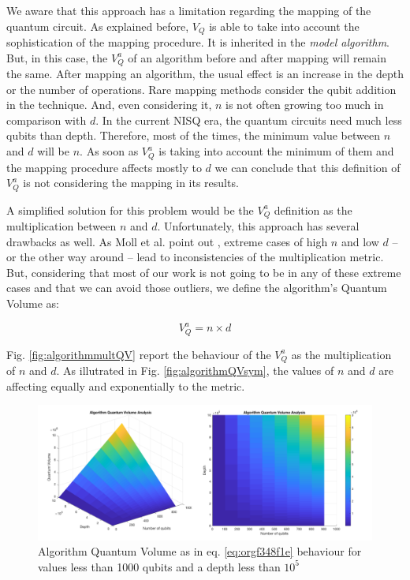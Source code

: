\begin{itemize}
\begin{itemize}
\begin{itemize}
We aware that this approach has a limitation regarding the mapping of the quantum circuit.
As explained before, \(V_Q\) is able to take into account the sophistication of the mapping procedure.
It is inherited in the \emph{model algorithm}.
But, in this case, the \(V^a_Q\) of an algorithm before and after mapping will remain the same.
After mapping an algorithm, the usual effect is an increase in the depth or the number of operations.
Rare mapping methods consider the qubit addition in the technique.
And, even considering it, \(n\) is not often growing too much in comparison with \(d\).
In the current NISQ era, the quantum circuits need much less qubits than depth.
Therefore, most of the times, the minimum value between \(n\) and \(d\) will be \(n\).
As soon as \(V^a_Q\) is taking into account the minimum of them and the mapping procedure affects mostly to \(d\) we can conclude that this definition of \(V^a_Q\) is not considering the mapping in its results.

A simplified solution for this problem would be the \(V^a_Q\) definition as the multiplication between \(n\) and \(d\).
Unfortunately, this approach has several drawbacks as well.
As Moll et al. point out \cite{Moll_2018}, extreme cases of high \(n\) and low \(d\) -- or the other way around -- lead to inconsistencies of the multiplication metric.
But, considering that most of our work is not going to be in any of these extreme cases and that we can avoid those outliers, we define the algorithm's Quantum Volume as:

\begin{equation}
\label{eq:orgf348f1e}
V_Q^a =  n \times d
\end{equation}

Fig. \ref{fig:algorithmmultQV} report the behaviour of the \(V_Q^a\) as
the multiplication of \(n\) and \(d\).
As illutrated in Fig. \ref{fig:algorithmQVsym}, the values of \(n\) and \(d\) are
affecting equally and exponentially to the metric.

\begin{figure}[htbp]
\centering
\includegraphics[width=\textwidth]{figures/V_q_analysis_mult.png}
\caption{\label{fig:org31d2373}
Algorithm Quantum Volume as in eq. \ref{eq:orgf348f1e} behaviour for values less than 1000 qubits and a depth less than \(10^{5}\)}
\end{figure}


\end{itemize}
\end{itemize}
\end{itemize}
